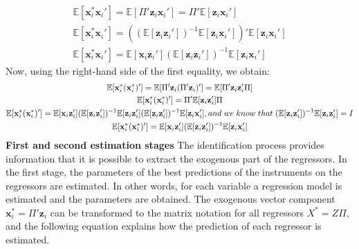 \documentclass{article}
\newcommand\tab[1][0.5cm]{\hspace*{#1}}
\begin{document}
\begin{gather*}
\mathbb{E}[\textbf{x}_{i}^{*} \textbf{x}_{i}'] = \mathbb{E}[\Pi' \textbf{z}_{i} \textbf{x}_{i}'] = \Pi' \mathbb{E}[\textbf{z}_{i} \textbf{x}_{i}'] \\
\mathbb{E}[\textbf{x}_{i}^{*} \textbf{x}_{i}'] = ((\mathbb{E}[\textbf{z}_{i} \textbf{z}_{i}'])^{-1} \mathbb{E}[\textbf{z}_{i} \textbf{x}_{i}'])' \mathbb{E}[\textbf{z}_{i} \textbf{x}_{i}'] \\
\mathbb{E}[\textbf{x}_{i}^{*} \textbf{x}_{i}'] = \mathbb{E}[\textbf{x}_{i} \textbf{z}_{i}'] (\mathbb{E}[\textbf{z}_{i} \textbf{z}_{i}'])^{-1} \mathbb{E}[\textbf{z}_{i} \textbf{x}_{i}'] 
\end{gather*} 
Now, using the right-hand side of the first equality, we obtain:
\begin{gather*}
\mathbb{E}[\textbf{x}_{i}^{*} (\textbf{x}_{i}^{*})'] = \mathbb{E}[\Pi' \textbf{z}_{i} (\Pi' \textbf{z}_{i})'] = \mathbb{E}[\Pi' \textbf{z}_{i}  \textbf{z}_{i}' \Pi] \\
\mathbb{E}[\textbf{x}_{i}^{*} (\textbf{x}_{i}^{*})'] = \Pi'\mathbb{E}[\textbf{z}_{i} \textbf{z}_{i}'] \Pi \\
\mathbb{E}[\textbf{x}_{i}^{*} (\textbf{x}_{i}^{*})'] = \mathbb{E}[\textbf{x}_{i} \textbf{z}_{i}'] (\mathbb{E}[\textbf{z}_{i} \textbf{z}_{i}'])^{-1} \mathbb{E}[\textbf{z}_{i} \textbf{z}_{i}'] (\mathbb{E}[\textbf{z}_{i} \textbf{z}_{i}'])^{-1} \mathbb{E}[\textbf{z}_{i} \textbf{x}_{i}'], and\tab[0.1cm]  we\tab[0.1cm]  know \tab[0.1cm] that\tab[0.1cm]  (\mathbb{E}[\textbf{z}_{i} \textbf{z}_{i}'])^{-1} \mathbb{E}[\textbf{z}_{i} \textbf{z}_{i}'] = I \\
\mathbb{E}[\textbf{x}_{i}^{*} (\textbf{x}_{i}^{*})'] = \mathbb{E}[\textbf{x}_{i} \textbf{z}_{i}'] (\mathbb{E}[\textbf{z}_{i} \textbf{z}_{i}'])^{-1} \mathbb{E}[\textbf{z}_{i} \textbf{x}_{i}'] \\
\end{gather*} 
\textbf{First and second estimation stages}
\newline
The identification process provides information that it is possible to extract the exogenous part of the regressors. In the first stage, the parameters of the best predictions of the instruments on the regressors are estimated. In other words, for each variable a regression model is estimated and the parameters are obtained.
\newline
The exogenous vector component $\textbf{x}_{i}^{*} =  \Pi' \textbf{z}_{i}$ can be transformed to the matrix notation for all regressors $X^{*} =  Z \Pi$, and the following equation explains how the prediction of each regressor is estimated.
\end{document}
